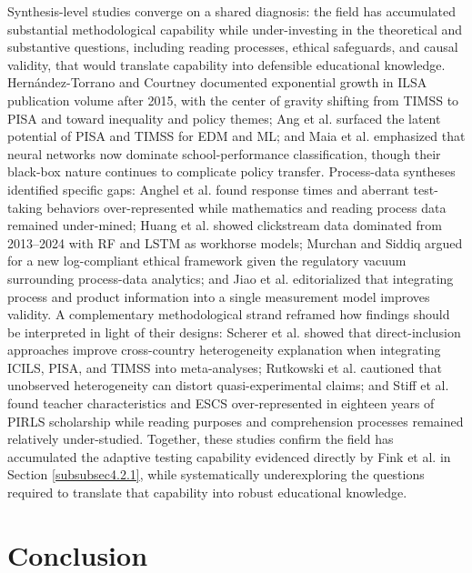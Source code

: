 \documentclass{ieeeaccess}
\begin{document}
Synthesis-level studies converge on a shared diagnosis: the field has accumulated substantial methodological capability while under-investing in the theoretical and substantive questions, including reading processes, ethical safeguards, and causal validity, that would translate capability into defensible educational knowledge. Hern\'{a}ndez-Torrano and Courtney \cite{hernandez-torrano-courtney2021} documented exponential growth in ILSA publication volume after 2015, with the center of gravity shifting from TIMSS to PISA and toward inequality and policy themes; Ang et al. \cite{ang-etal2020} surfaced the latent potential of PISA and TIMSS for EDM and ML; and Maia et al. \cite{maia-etal023} emphasized that neural networks now dominate school-performance classification, though their black-box nature continues to complicate policy transfer. Process-data syntheses identified specific gaps: Anghel et al. \cite{anghel-etal2024} found response times and aberrant test-taking behaviors over-represented while mathematics and reading process data remained under-mined; Huang et al. \cite{huang-etal2025} showed clickstream data dominated from 2013--2024 with RF and LSTM as workhorse models; Murchan and Siddiq \cite{murchan-siddiq2021} argued for a new log-compliant ethical framework given the regulatory vacuum surrounding process-data analytics; and Jiao et al. \cite{jiao-etal2021} editorialized that integrating process and product information into a single measurement model improves validity. A complementary methodological strand reframed how findings should be interpreted in light of their designs: Scherer et al. \cite{scherer-etal2024} showed that direct-inclusion approaches improve cross-country heterogeneity explanation when integrating ICILS, PISA, and TIMSS into meta-analyses; Rutkowski et al. \cite{rutkowski-etal2024} cautioned that unobserved heterogeneity can distort quasi-experimental claims; and Stiff et al. \cite{stiff-etal2023} found teacher characteristics and ESCS over-represented in eighteen years of PIRLS scholarship while reading purposes and comprehension processes remained relatively under-studied. Together, these studies confirm the field has accumulated the adaptive testing capability evidenced directly by Fink et al. \cite{fink-etal2024} in Section \ref{subsubsec4.2.1}, while systematically underexploring the questions required to translate that capability into robust educational knowledge.

\section{Conclusion}\label{conclusion}
\end{document}
